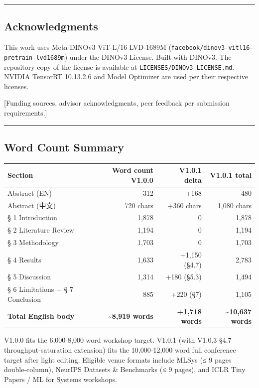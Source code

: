 \documentclass[
]{article}
\newcounter{none} %
\begin{document}
\begin{center}\rule{0.5\linewidth}{0.5pt}\end{center}

\subsection{Acknowledgments}\label{acknowledgments}

This work uses Meta DINOv3 ViT-L/16 LVD-1689M
(\texttt{facebook/dinov3-vitl16-pretrain-lvd1689m}) under the DINOv3
License. Built with DINOv3. The repository copy of the license is
available at \texttt{LICENSES/DINOv3\_LICENSE.md}. NVIDIA TensorRT
10.13.2.6 and Model Optimizer are used per their respective licenses.

{[}Funding sources, advisor acknowledgments, peer feedback per
submission requirements.{]}

\begin{center}\rule{0.5\linewidth}{0.5pt}\end{center}

\subsection{Word Count Summary}\label{word-count-summary}

{\def\LTcaptype{none} %
\begin{longtable}[]{@{}lrrr@{}}
\toprule\noalign{}
Section & Word count V1.0.0 & V1.0.1 delta & V1.0.1 total \\
\midrule\noalign{}
\endhead
\bottomrule\noalign{}
\endlastfoot
Abstract (EN) & 312 & +168 & 480 \\
Abstract (中文) & 720 chars & +360 chars & 1,080 chars \\
§ 1 Introduction & 1,878 & 0 & 1,878 \\
§ 2 Literature Review & 1,194 & 0 & 1,194 \\
§ 3 Methodology & 1,703 & 0 & 1,703 \\
§ 4 Results & 1,633 & +1,150 (§4.7) & 2,783 \\
§ 5 Discussion & 1,314 & +180 (§5.3) & 1,494 \\
§ 6 Limitations + § 7 Conclusion & 885 & +220 (§7) & 1,105 \\
\textbf{Total English body} & \textbf{\textasciitilde8,919 words} &
\textbf{+1,718 words} & \textbf{\textasciitilde10,637 words} \\
\end{longtable}
}

V1.0.0 fits the 6,000-8,000 word workshop target. V1.0.1 (with V1.0.3
§4.7 throughput-saturation extension) fits the 10,000-12,000 word full
conference target after light editing. Eligible venue formats include
MLSys (≤ 9 pages double-column), NeurIPS Datasets \& Benchmarks (≤ 9
pages), and ICLR Tiny Papers / ML for Systems workshops.
\end{document}
